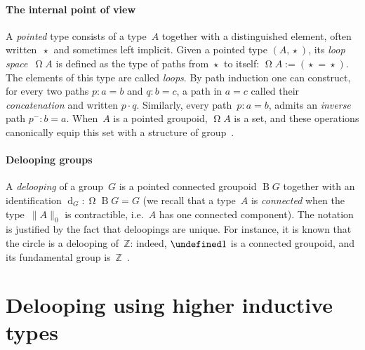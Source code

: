 \documentclass[10pt,a4paper]{amsart}
\theoremstyle{definition}
\newcommand{\Z}{\mathbb{Z}} %
\let\S\undefined
\newcommand{\S}[1]{\operatorname{S}^{#1}} %
\newcommand{\B}{\operatorname{B}} %
\newcommand{\pt}[1]{\star_{#1}} %
\newcommand{\trunc}[2]{\|#2\|_{#1}} %
\newcommand{\strunc}[1]{\trunc0{#1}} %
\newcommand{\defd}{:=} %
\newcommand{\pcomp}{\cdot} %
\newcommand{\sym}[1]{#1^-} %
\newcommand{\Beq}[1]{\operatorname{d}_{#1}} %
\newcommand{\Loop}{\operatorname{\Omega}} %
\newcommand{\ie}{i.e.~}
\begin{document}
\paragraph{The internal point of view}
\label{internal-groups} 
A \emph{pointed} type consists of a type~$A$ together with a distinguished
element, often written~$\pt{}$ and sometimes left implicit. Given a pointed type
$(A,\pt{})$, its \emph{loop space}~$\Loop A$ is defined as the type of paths
from $\pt{}$ to itself: $\Loop A\defd(\pt{}=\pt{})$. The elements of this type
are called \emph{loops}. By path induction one can construct, for every two
paths $p:a=b$ and $q:b=c$, a path in $a=c$ called their \emph{concatenation} and
written $p\pcomp q$. Similarly, every path~$p:a=b$, admits an \emph{inverse}
path $\sym p:b=a$. When~$A$ is a pointed groupoid, $\Loop A$ is a set, and these
operations canonically equip this set with a structure of
group~\cite[Section~2.1]{hottbook}.

\paragraph{Delooping groups}
A \emph{delooping} of a group~$G$ is a pointed connected groupoid $\B G$
together with an identification $\Beq G:\Loop\B G=G$ (we recall that a type~$A$
is \emph{connected} when the type~$\strunc{A}$ is contractible, \ie $A$ has one
connected component).
%
The notation is justified by the fact that deloopings are unique.
%
For instance, it is known that the circle is a delooping of~$\Z$: indeed, $\S1$ is a connected groupoid, and its fundamental group is~$\Z$~\cite[Section~8.1]{hottbook}.


\section{Delooping using higher inductive types}
\label{delooping-hit}
\end{document}

